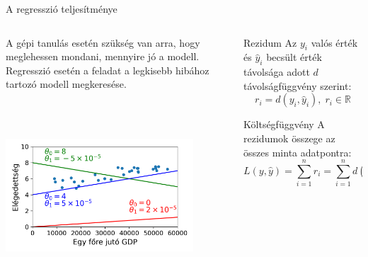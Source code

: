 \documentclass[english, aspectratio=169]{beamer}
\begin{document}
\begin{frame}{A regresszió teljesítménye}
\begin{columns}
\begin{column}{.5\textwidth}
A gépi tanulás esetén szükség van arra, hogy meglehessen mondani, mennyire jó a modell. Regresszió esetén a feladat a legkisebb hibához tartozó modell megkeresése.
\begin{center}
\includegraphics[width=7cm, height=7cm, keepaspectratio]{images/regresszio_11.png}
\end{center}
\end{column}
\begin{column}{.5\textwidth}
\begin{block}{Rezidum}
Az $y_i$ valós érték és $\hat{y}_i$ becsült érték távolsága adott $d$ távolságfüggvény szerint:
\[
r_i = d\left( y_i,\hat{y}_i \right), \; r_i \in \mathbb{R}
\]
\end{block}
\begin{block}{Költségfüggvény}
A rezidumok összege az összes minta adatpontra:
\[
L\left( y,\hat{y}  \right) = \sum_{i=1}^n r_i = \sum_{i=1}^n d\left( y_i,\hat{y}_i \right)
\]
\end{block}
\end{column}
\end{columns}
\end{frame}
\end{document}
